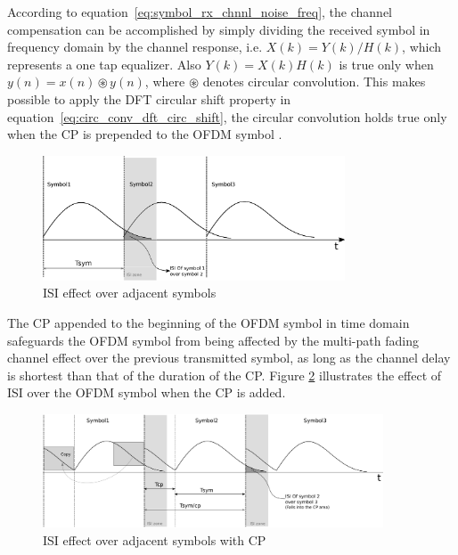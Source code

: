 According to equation~\ref{eq:symbol_rx_chnnl_noise_freq}, the channel compensation can be accomplished by simply dividing the received symbol in frequency domain by the channel response, i.e. $X(k) = Y(k)/H(k)$, which represents a one tap equalizer. Also $Y(k)=X(k)H(k)$ is true only when $ y(n) = x(n) \circledast y(n)$, where $\circledast$ denotes circular convolution. This makes possible to apply the DFT circular shift property in equation~\ref{eq:circ_conv_dft_circ_shift}, the circular convolution holds true only when the CP is prepended to the OFDM symbol \cite{cho2010mimo}.



\begin{figure}[hbt]
  \centering
    \includegraphics[width=0.8\textwidth]
      {./figures/isi_fig}
  \caption{ISI effect over adjacent symbols}
  \label{fig:isi_symbols}
\end{figure}

 The CP appended to the beginning of the OFDM symbol in time domain safeguards the OFDM symbol from being affected by the multi-path fading channel effect over the previous transmitted symbol, as long as the channel delay is shortest than that of the duration of the CP. Figure \ref{fig:isi_symbols_cp} illustrates the effect of ISI over the OFDM symbol when the CP is added. 

\begin{figure}[hbt]
  \centering
    \includegraphics[width=0.9\textwidth]
      {./figures/isi_cp_2}
  \caption{ISI effect over adjacent symbols with CP}
  \label{fig:isi_symbols_cp}
\end{figure}


